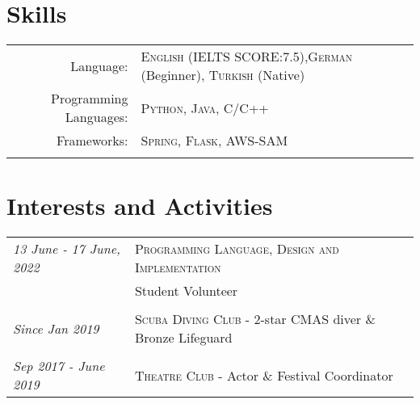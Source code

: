 \documentclass[a4paper,10pt]{article} %
\begin{document}


\section{Skills}

\begin{longtable}{rl}
Language: & \textsc{English} \small(IELTS SCORE:7.5),\textsc{German} \small(Beginner), \textsc{Turkish} \small(Native)\\

Programming Languages: & \textsc{Python}, \textsc{Java}, \textsc{C/C++}\\

Frameworks: & \textsc{Spring}, \textsc{Flask}, \textsc{AWS-SAM}\\
&\\
\end{longtable}





\section{Interests and Activities}
\begin{longtable}{l|l}
\emph{13 June - 17 June, 2022} & \textsc{Programming Language, Design and Implementation}\\ & Student Volunteer\\
\multicolumn{2}{c}{} \\
\emph{Since Jan 2019} & \textsc{Scuba Diving Club} - 2-star CMAS diver \& Bronze Lifeguard\\
\multicolumn{2}{c}{} \\
\emph{Sep 2017 - June 2019} & \textsc{Theatre Club} - Actor \& Festival Coordinator
\end{longtable}


\end{document}
